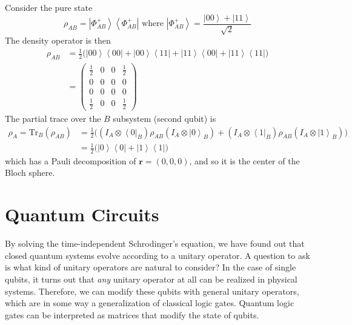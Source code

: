 \documentclass{article}
\newcommand{\ket}[1]{\ensuremath{\left|#1\right\rangle}}
\newcommand{\bra}[1]{\ensuremath{\left\langle#1\right|}}
\begin{document}
    \begin{example}
      Consider the pure state 
      \begin{equation}
        \rho_{AB} = \ket{\Phi^+_{AB}} \bra{\Phi^+_{AB}} \text{ where } \ket{\Phi^+_{AB}} = \frac{\ket{00} + \ket{11}}{\sqrt{2}}
      \end{equation}
      The density operator is then 
      \begin{align}
        \rho_{AB} & = \frac{1}{2} \big( \ket{00} \bra{00} + \ket{00} \bra{11} + \ket{11} \bra{00} + \ket{11} \bra{11} \big) \\
                  & = \begin{pmatrix} \frac{1}{2} & 0 & 0 & \frac{1}{2} \\ 0 & 0 & 0 & 0 \\ 0 & 0 & 0 & 0 \\ \frac{1}{2} & 0 & 0 & \frac{1}{2} \end{pmatrix}
      \end{align}
      The partial trace over the $B$ subsystem (second qubit) is 
      \begin{align}
        \rho_A = \mathrm{Tr}_B (\rho_{AB}) & = \frac{1}{2} \big( (I_A \otimes \bra{0}_B) \rho_{AB} (I_A \otimes \ket{0}_B) + (I_A \otimes \bra{1}_B) \rho_{AB} (I_A \otimes \ket{1}_B) \big) \\ 
                                           & = \frac{1}{2} \big( \ket{0} \bra{0} + \ket{1} \bra{1} \big)
      \end{align}
      which has a Pauli decomposition of $\mathbf{r} = (0, 0, 0)$, and so it is the center of the Bloch sphere.
    \end{example}

\section{Quantum Circuits}

    By solving the time-independent Schrodinger's equation, we have found out that closed quantum systems evolve according to a unitary operator. A question to ask is what kind of unitary operators are natural to consider? In the case of single qubits, it turns out that \textit{any} unitary operator at all can be realized in physical systems. Therefore, we can modify these qubits with general unitary operators, which are in some way a generalization of classical logic gates. Quantum logic gates can be interpreted as matrices that modify the state of qubits. 
\end{document}
